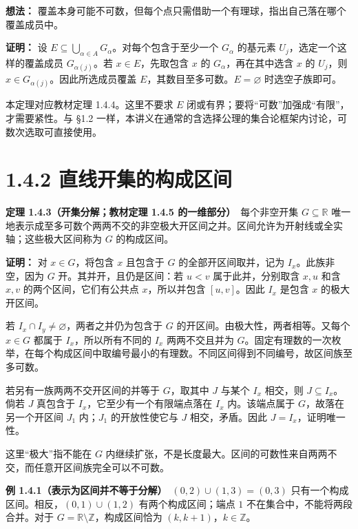\documentclass[11pt,a4paper]{article}
\begin{document}
\textbf{想法：}
覆盖本身可能不可数，但每个点只需借助一个有理球，指出自己落在哪个覆盖成员中。

\textbf{证明：} 设
\(E\subseteq\bigcup_{\alpha\in A}G_\alpha\)。对每个包含于至少一个
\(G_\alpha\) 的基元素 \(U_j\)，选定一个这样的覆盖成员
\(G_{\alpha(j)}\)。若 \(x\in E\)，先取包含 \(x\) 的
\(G_\alpha\)，再在其中选含 \(x\) 的 \(U_j\)，则
\(x\in G_{\alpha(j)}\)。因此所选成员覆盖
\(E\)，其数目至多可数。\(E=\varnothing\) 时选空子族即可。

本定理对应教材定理 1.4.4。这里不要求 \(E\)
闭或有界；要将``可数''加强成``有限''，才需要紧性。与 §1.2
一样，本讲义在通常的含选择公理的集合论框架内讨论，可数次选取可直接使用。

\section[\S{}1.4.2
直线开集的构成区间]{1.4.2
直线开集的构成区间}\label{ux76f4ux7ebfux5f00ux96c6ux7684ux6784ux6210ux533aux95f4}

\textbf{定理 1.4.3（开集分解；教材定理 1.4.5 的一维部分）}　每个非空开集
\(G\subseteq\mathbb R\)
唯一地表示成至多可数个两两不交的非空极大开区间之并。区间允许为开射线或全实轴；这些极大区间称为
\(G\) 的构成区间。

\textbf{证明：} 对 \(x\in G\)，将包含 \(x\) 且包含于 \(G\)
的全部开区间取并，记为 \(I_x\)。此族非空，因为 \(G\)
开。其并开，且仍是区间：若 \(u<v\) 属于此并，分别取含 \(x,u\) 和含
\(x,v\) 的两个区间，它们有公共点 \(x\)，所以并包含 \([u,v]\)。因此
\(I_x\) 是包含 \(x\) 的极大开区间。

若 \(I_x\cap I_y\ne\varnothing\)，两者之并仍为包含于 \(G\)
的开区间。由极大性，两者相等。又每个 \(x\in G\) 都属于
\(I_x\)，所以所有不同的 \(I_x\) 两两不交且并为
\(G\)。固定有理数的一次枚举，在每个构成区间中取编号最小的有理数。不同区间得到不同编号，故区间族至多可数。

若另有一族两两不交开区间的并等于 \(G\)，取其中 \(J\) 与某个 \(I_x\)
相交，则 \(J\subseteq I_x\)。倘若 \(J\) 真包含于
\(I_x\)，它至少有一个有限端点落在 \(I_x\) 内。该端点属于
\(G\)，故落在另一个开区间 \(J_1\) 内；\(J_1\) 的开放性使它与 \(J\)
相交，矛盾。因此 \(J=I_x\)，证明唯一性。

这里``极大''指不能在 \(G\)
内继续扩张，不是长度最大。区间的可数性来自两两不交，而任意开区间族完全可以不可数。

\textbf{例 1.4.1（表示为区间并不等于分解）}　\((0,2)\cup(1,3)=(0,3)\)
只有一个构成区间。相反，\((0,1)\cup(1,2)\) 有两个构成区间；端点 \(1\)
不在集合中，不能将两段合并。对于
\(G=\mathbb R\setminus\mathbb Z\)，构成区间恰为
\((k,k+1)\)，\(k\in\mathbb Z\)。
\end{document}
